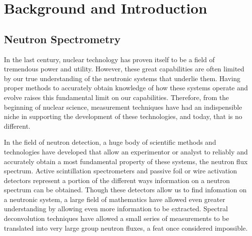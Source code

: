
\cleardoublepage


\chapter{Background and Introduction}



\section{Neutron Spectrometry}
In the last century, nuclear technology has proven itself to be a field of tremendous power and utility.
However, these great capabilities are often limited by our true understanding of the neutronic systems that underlie them.
Having proper methods to accurately obtain knowledge of how these systems operate and evolve raises this fundamental limit on our capabilities.
Therefore, from the beginning of nuclear science, measurement techniques have had an indispensible niche in supporting the development of these technologies, and today, that is no different.


In the field of neutron detection, a huge body of scientific methods and technologies have developed that allow an experimentor or analyst to reliably and accurately obtain a most fundamental property of these systems, the neutron flux spectrum.
Active scintillation spectrometers and passive foil or wire activation detectors represent a portion of the different ways information on a neutron spectrum can be obtained.
Though these detectors allow us to find infomation on a neutronic system, a large field of mathematics have allowed even greater understanding by allowing even more information to be extracted.
Spectral deconvolution techniques have allowed a small series of measurements to be translated into very large group neutron fluxes, a feat once considered impossible.

